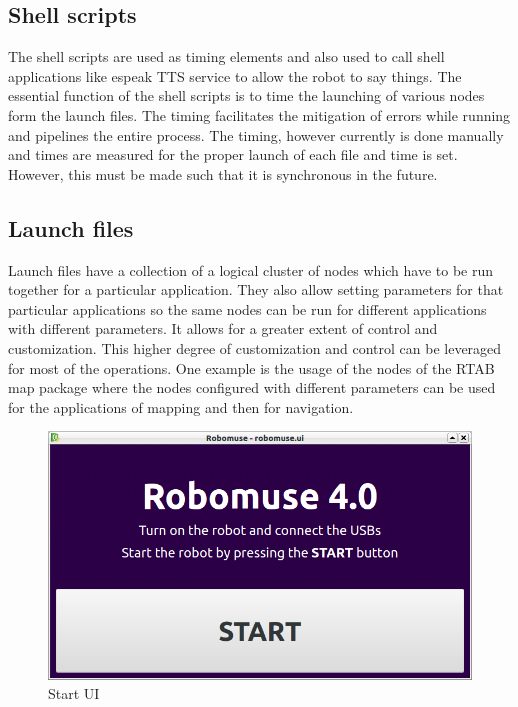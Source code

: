 \documentclass[12pt]{article}
\begin{document}
\subsection{Shell scripts}
The shell scripts are used as timing elements and also used to call shell applications like espeak TTS service to allow the robot to say things. The essential function of the shell scripts is to time the launching of various nodes form the launch files. The timing facilitates the mitigation of errors while running and pipelines the entire process. The timing, however currently is done manually and times are measured for the proper launch of each file and time is set. However, this must be made such that it is synchronous in the future.

\subsection{Launch files}
Launch files have a collection of a logical cluster of nodes which have to be run together for a particular application. They also allow setting parameters for that particular applications so the same nodes can be run for different applications with different parameters. It allows for a greater extent of control and customization. This higher degree of customization and control can be leveraged for most of the operations. One example is the usage of the nodes of the RTAB map package where the nodes configured with different parameters can be used for the applications of mapping and then for navigation.

\begin{figure}[H]
\centering
\includegraphics[scale=0.5]{Robomuse.png}
\caption{Start UI}
\end{figure}
\end{document}
